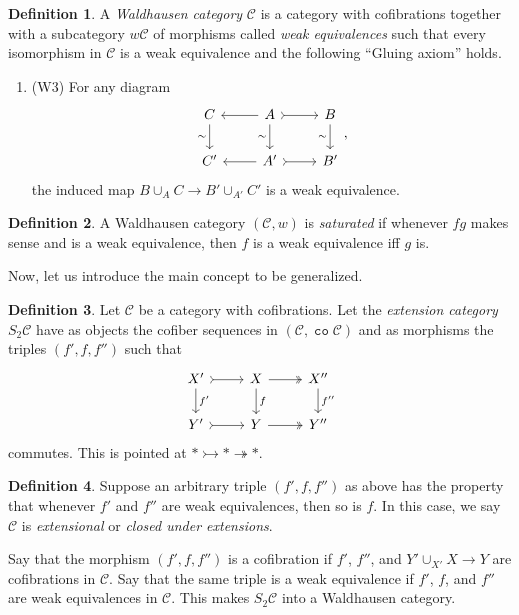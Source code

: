 \documentclass[10pt,letterpaper,cm]{nupset}
\theoremstyle{definition}
\newtheorem{definition}{Definition}
\theoremstyle{theorem}
\theoremstyle{remark}
\newcommand{\1}{\mathbf{1}}
\renewcommand{\c}{\mathscr{C}}
\newcommand{\0}{\vec 0}
\DeclareMathOperator{\co}{\mathtt{co}}
\begin{document}
\begin{definition}
A \textit{Waldhausen category} $\c$ is a category with cofibrations together with a subcategory $w{\c}$ of morphisms called \textit{weak equivalences} such that every isomorphism in $\c$ is a weak equivalence and the following ``Gluing axiom'' holds.
\begin{enumerate}
\item (W3) For any diagram
\[
\begin{tikzcd}
C \arrow[d, "\sim"'] & A \arrow[d, "\sim"'] \arrow[r, tail] \arrow[l] & B \arrow[d, "\sim"'] \\
C' & A' \arrow[r, tail] \arrow[l] & B'
\end{tikzcd}, \]
the induced map $B \cup_A C \to  B' \cup_{A'} C'$ is a weak equivalence.
\end{enumerate}
\end{definition}

\begin{definition}
A Waldhausen category $(\c, w)$ is \textit{saturated} if whenever $fg$ makes sense and is a weak equivalence, then $f$ is a weak equivalence iff $g$ is. 
\end{definition}

\smallskip

Now, let us introduce the main concept to be generalized.

\begin{definition}

 Let $\c$ be a category with cofibrations. Let the \textit{extension category} $S_2\c$ have as objects the cofiber sequences in $\left(\c, \co{\c}\right)$ and as morphisms the triples $(f', f, f'')$ such that
\[
\begin{tikzcd}
X' \arrow[r, tail] \arrow[d, "f'"] & X \arrow[r, two heads] \arrow[d, "f"] & X'' \arrow[d, "f''"] \\
Y' \arrow[r, tail] & Y \arrow[r, two heads] & Y''
\end{tikzcd}
\] 
commutes. This is pointed at $\ast \rightarrowtail \ast \twoheadrightarrow \ast$.
\end{definition}

\begin{definition}
Suppose an arbitrary triple $(f', f, f'')$ as above has the property that whenever $f'$ and $f''$ are weak equivalences, then so is $f$. In this case, we say $\c$ is \textit{extensional} or \textit{closed under extensions}.
\end{definition}


Say that the morphism $\left(f', f, f''\right)$ is a cofibration if $f'$, $f''$, and $Y' \cup_{X'} X \to Y$ are cofibrations in $\c$. Say that  the same triple is a weak equivalence if $f'$, $f$, and $f''$ are weak equivalences in $\c$. This makes $S_2 \c$ into a Waldhausen category.
\end{document}
